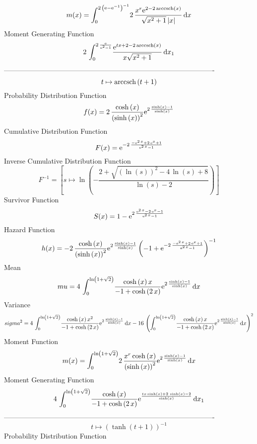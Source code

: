 \documentclass[12pt]{article}
\begin{document}
 $$ m(x) = \int_{0}^{2\, \left( {\rm e}-{{\rm e}^{-1}} \right) ^{-1}}\!2\,{\frac 
{{x}^{r}{{\rm e}^{2-2\,{\rm arccsch} \left(x\right)}}}{\sqrt {{x}^{2}+
1} \left| x \right| }}\,{\rm d}x
$$ Moment Generating Function 
 $$2\,\int_{0}^{2\,{\frac {{\rm e}}{{{\rm e}^{2}}-1}}}\!{\frac {{{\rm e}^
{tx+2-2\,{\rm arccsch} \left(x\right)}}}{x\sqrt {{x}^{2}+1}}}\,{\rm d}
x_{{1}}
$$-------------------------------------------------------------------------------------------  \\$$t\mapsto {\rm arccsch} \left(t+1\right)
$$Probability Distribution Function 
$$  f(x)=2\,{\frac {\cosh \left( x \right) }{ \left( \sinh \left( x \right) 
 \right) ^{2}}{{\rm e}^{2\,{\frac {\sinh \left( x \right) -1}{\sinh
 \left( x \right) }}}}}
$$Cumulative Distribution Function  
 $$F(x)={{\rm e}^{-2\,{\frac {-{{\rm e}^{2\,x}}+2\,{{\rm e}^{x}}+1}{{{\rm e}^{
2\,x}}-1}}}}
$$ Inverse Cumulative Distribution Function 
  $$F^{-1} =   
[s\mapsto \ln  \left( -{\frac {2+\sqrt { \left( \ln  \left( s \right) 
 \right) ^{2}-4\,\ln  \left( s \right) +8}}{\ln  \left( s \right) -2}}
 \right) ]
$$Survivor Function 
 $$ S(x)=1-{{\rm e}^{2\,{\frac {{{\rm e}^{2\,x}}-2\,{{\rm e}^{x}}-1}{{{\rm e}^{
2\,x}}-1}}}}
$$ Hazard Function 
 $$ h(x)=-2\,{\frac {\cosh \left( x \right) }{ \left( \sinh \left( x \right) 
 \right) ^{2}}{{\rm e}^{2\,{\frac {\sinh \left( x \right) -1}{\sinh
 \left( x \right) }}}} \left( -1+{{\rm e}^{-2\,{\frac {-{{\rm e}^{2\,x
}}+2\,{{\rm e}^{x}}+1}{{{\rm e}^{2\,x}}-1}}}} \right) ^{-1}}
$$Mean 
 $$ mu=4\,\int_{0}^{\ln  \left( 1+\sqrt {2} \right) }\!{\frac {\cosh \left( x
 \right) x}{-1+\cosh \left( 2\,x \right) }{{\rm e}^{2\,{\frac {\sinh
 \left( x \right) -1}{\sinh \left( x \right) }}}}}\,{\rm d}x
$$ Variance 
 $$ sigma^2 = 4\,\int_{0}^{\ln  \left( 1+\sqrt {2} \right) }\!{\frac {\cosh \left( x
 \right) {x}^{2}}{-1+\cosh \left( 2\,x \right) }{{\rm e}^{2\,{\frac {
\sinh \left( x \right) -1}{\sinh \left( x \right) }}}}}\,{\rm d}x-16\,
 \left( \int_{0}^{\ln  \left( 1+\sqrt {2} \right) }\!{\frac {\cosh
 \left( x \right) x}{-1+\cosh \left( 2\,x \right) }{{\rm e}^{2\,{
\frac {\sinh \left( x \right) -1}{\sinh \left( x \right) }}}}}
\,{\rm d}x \right) ^{2}
$$Moment Function 
 $$ m(x) = \int_{0}^{\ln  \left( 1+\sqrt {2} \right) }\!2\,{\frac {{x}^{r}\cosh
 \left( x \right) }{ \left( \sinh \left( x \right)  \right) ^{2}}{
{\rm e}^{2\,{\frac {\sinh \left( x \right) -1}{\sinh \left( x \right) 
}}}}}\,{\rm d}x
$$ Moment Generating Function 
 $$4\,\int_{0}^{\ln  \left( 1+\sqrt {2} \right) }\!{\frac {\cosh \left( x
 \right) }{-1+\cosh \left( 2\,x \right) }{{\rm e}^{{\frac {tx\sinh
 \left( x \right) +2\,\sinh \left( x \right) -2}{\sinh \left( x
 \right) }}}}}\,{\rm d}x_{{1}}
$$-------------------------------------------------------------------------------------------  \\$$t\mapsto  \left( \tanh \left( t+1 \right)  \right) ^{-1}
$$Probability Distribution Function 
\end{document}

